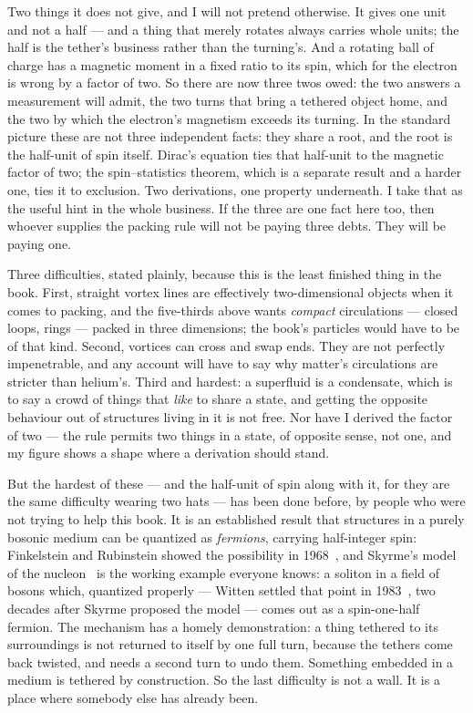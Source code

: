 \documentclass[fontsize=11pt,paper=a4,pagesize=auto,parskip=half-]{scrbook}
\newcommand{\Iy}[1]{#1\index{#1}}
\begin{document}
Two things it does not give, and I will not pretend otherwise. It gives one unit and not a half --- and a thing that merely rotates always carries whole units; the half is the tether's business rather than the turning's. And a rotating ball of charge has a magnetic moment in a fixed ratio to its spin, which for the electron is wrong by a factor of two. So there are now three twos owed: the two answers a measurement will admit, the two turns that bring a tethered object home, and the two by which the electron's magnetism exceeds its turning. In the standard picture these are not three independent facts: they share a root, and the root is the half-unit of spin itself. \Iy{Dirac}'s equation ties that half-unit to the magnetic factor of two; the spin--statistics theorem, which is a separate result and a harder one, ties it to exclusion. Two derivations, one property underneath. I take that as the useful hint in the whole business. If the three are one fact here too, then whoever supplies the packing rule will not be paying three debts. They will be paying one.


Three difficulties, stated plainly, because this is the least finished thing in the book. First, straight vortex lines are effectively two-dimensional objects when it comes to packing, and the five-thirds above wants \emph{compact} circulations --- closed loops, rings --- packed in three dimensions; the book's particles would have to be of that kind. Second, vortices can cross and swap ends. They are not perfectly impenetrable, and any account will have to say why matter's circulations are stricter than helium's. Third and hardest: a superfluid is a condensate, which is to say a crowd of things that \emph{like} to share a state, and getting the opposite behaviour out of structures living in it is not free. Nor have I derived the factor of two --- the rule permits two things in a state, of opposite sense, not one, and my figure shows a shape where a derivation should stand.

But the hardest of these --- and the half-unit of spin along with it, for they are the same difficulty wearing two hats --- has been done before, by people who were not trying to help this book. It is an established result that structures in a purely bosonic medium can be quantized as \emph{fermions}, carrying half-integer spin: Finkelstein and Rubinstein showed the possibility in 1968~\cite{finkelstein1968}, and \Iy{Skyrme}'s model of the nucleon~\cite{skyrme1962} is the working example everyone knows: a soliton in a field of bosons which, quantized properly --- \Iy{Witten} settled that point in 1983~\cite{witten1983}, two decades after Skyrme proposed the model --- comes out as a spin-one-half fermion. The mechanism has a homely demonstration: a thing tethered to its surroundings is not returned to itself by one full turn, because the tethers come back twisted, and needs a second turn to undo them. Something embedded in a medium is tethered by construction. So the last difficulty is not a wall. It is a place where somebody else has already been.
\end{document}
